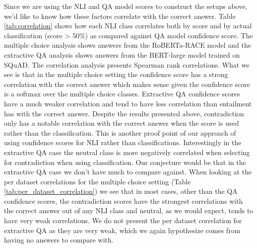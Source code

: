 \documentclass[11pt]{article}
\begin{document}
Since we are using the NLI and QA model scores to construct the setups above, we’d like to know how these factors correlate with the correct answer. Table \ref{tab:correlation} shows how each NLI class correlates both by score and by actual classification (score > 50\%) as compared against QA model confidence score. The multiple choice analysis shows answers from the RoBERTa-RACE model and the extractive QA analysis shows answers from the BERT-large model trained on SQuAD. The correlation analysis presents Spearman rank correlations. What we see is that in the multiple choice setting the confidence score has a strong correlation with the correct answer which makes sense given the confidence score is a softmax over the multiple choice classes. Extractive QA confidence scores have a much weaker correlation and tend to have less correlation than entailment has with the correct answer. Despite the results presented above, contradiction only has a notable correlation with the correct answer when the score is used rather than the classification. This is another proof point of our approach of using confidence scores for NLI rather than classifications. Interestingly in the extractive QA case the neutral class is more negatively correlated when selecting for contradiction when using classification. Our conjecture would be that in the extractive QA case we don’t have much to compare against. When looking at the per dataset correlations for the multiple choice setting (Table \ref{tab:per_dataset_correlation}) we see that in most cases, other than the QA confidence scores, the contradiction scores have the strongest correlations with the correct answer out of any NLI class and neutral, as we would expect, tends to have very weak correlations. We do not present the per dataset correlation for extractive QA as they are very weak, which we again hypothesize comes from having no answers to compare with.
\end{document}
